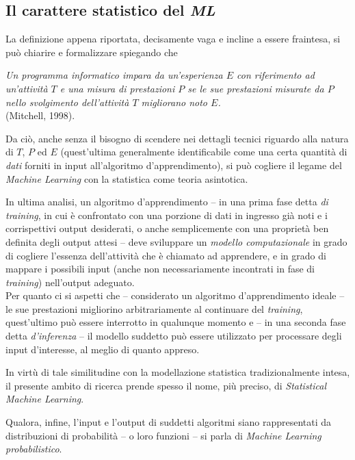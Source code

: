 \documentclass[a4paper, twoside]{article}
\begin{document}
\subsection{Il carattere statistico del \textit{ML}}

La definizione appena riportata, decisamente vaga e incline a essere fraintesa, si può chiarire e formalizzare spiegando che
\begin{displayquote}
	\textit{Un programma informatico impara da un'esperienza $E$ con riferimento ad un'attività $T$ e una misura di prestazioni $P$ se le sue prestazioni misurate da $P$ nello svolgimento dell'attività $T$ migliorano noto $E$.} \\(Mitchell, 1998).
\end{displayquote}

Da ciò, anche senza il bisogno di scendere nei dettagli tecnici riguardo alla natura di $T$, $P$ ed $E$ (quest'ultima generalmente identificabile come una certa quantità di \textit{dati} forniti in input all'algoritmo d'apprendimento), si può cogliere il legame del \textit{Machine Learning} con la statistica come teoria asintotica.

In ultima analisi, un algoritmo d'apprendimento -- in una prima fase detta \textit{di training}, in cui è confrontato con una porzione di dati in ingresso già noti e i corrispettivi output desiderati, o anche semplicemente con una proprietà ben definita degli output attesi  -- deve sviluppare un \textit{modello computazionale} in grado di cogliere l'essenza dell'attività che è chiamato ad apprendere, e in grado di mappare i possibili input (anche non necessariamente incontrati in fase di \textit{training}) nell'output adeguato.\\
Per quanto ci si aspetti che -- considerato un algoritmo d'apprendimento ideale -- le sue prestazioni migliorino arbitrariamente al continuare del \textit{training}, quest'ultimo può essere interrotto in qualunque momento e -- in una seconda fase detta \textit{d'inferenza} -- il modello suddetto può essere utilizzato per processare degli input d'interesse, al meglio di quanto appreso.

In virtù di tale similitudine con la modellazione statistica tradizionalmente intesa, il presente ambito di ricerca prende spesso il nome, più preciso, di \textit{Statistical Machine Learning}.

Qualora, infine, l'input e l'output di suddetti algoritmi siano rappresentati da distribuzioni di probabilità -- o loro funzioni -- si parla di \textit{Machine Learning probabilistico}.
\end{document}
